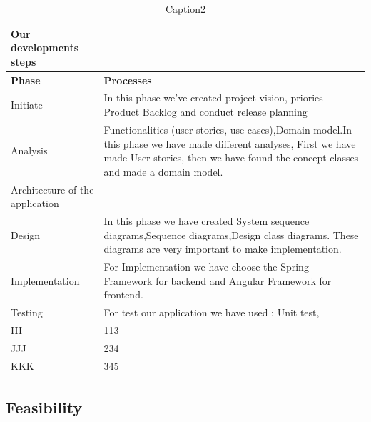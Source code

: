 \documentclass{scrartcl}
\begin{document}
\begin{table}[h]
\begin{center}
\begin{tabular}{| p{7cm}| p{7cm} |}
Our developments steps \\
\hline
\textbf{Phase} & \textbf{Processes} \\
\hline
Initiate                    &             In this phase we've created project vision, priories Product Backlog and conduct release planning \\ \hline
Analysis                    &             Functionalities (user stories, use cases),Domain model.In this phase we have made different analyses, First we have made User stories, then we have found the concept classes and made a domain model.\\ \hline
Architecture of the application                   &           \\ \hline
Design                   &        In this phase we have created  System sequence diagrams,Sequence diagrams,Design class diagrams. These diagrams are very important to make implementation. \\ \hline
Implementation                   &           For Implementation we have choose the Spring Framework for backend and Angular Framework for frontend.\\ \hline
Testing                   &            For test our application we have used : Unit test,  \\ \hline
III                    &              113\\ \hline
JJJ                    &              234\\ \hline
KKK                    &              345\\ \hline
\end{tabular}
\end{center}
\caption{Caption2}
\label{table2}
\end{table}

\subsection{Feasibility}
\end{document}
